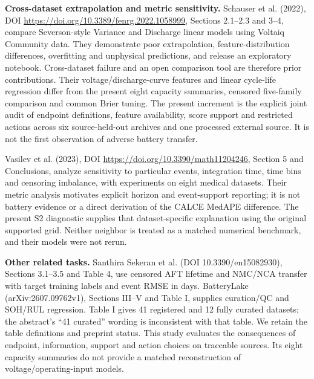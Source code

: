 \documentclass[10pt,a4paper]{article}
\begin{document}
\textbf{Cross-dataset extrapolation and metric sensitivity.} Schauser et al. (2022), DOI \url{https://doi.org/10.3389/fenrg.2022.1058999}, Sections 2.1--2.3 and 3--4, compare Severson-style Variance and Discharge linear models using Voltaiq Community data. They demonstrate poor extrapolation, feature-distribution differences, overfitting and unphysical predictions, and release an exploratory notebook. Cross-dataset failure and an open comparison tool are therefore prior contributions. Their voltage/discharge-curve features and linear cycle-life regression differ from the present eight capacity summaries, censored five-family comparison and common Brier tuning. The present increment is the explicit joint audit of endpoint definitions, feature availability, score support and restricted actions across six source-held-out archives and one processed external source. It is not the first observation of adverse battery transfer.

Vasilev et al. (2023), DOI \url{https://doi.org/10.3390/math11204246}, Section 5 and Conclusions, analyze sensitivity to particular events, integration time, time bins and censoring imbalance, with experiments on eight medical datasets. Their metric analysis motivates explicit horizon and event-support reporting; it is not battery evidence or a direct derivation of the CALCE MedAPE difference. The present S2 diagnostic supplies that dataset-specific explanation using the original supported grid. Neither neighbor is treated as a matched numerical benchmark, and their models were not rerun.

\textbf{Other related tasks.} Santhira Sekeran et al. (DOI 10.3390/en15082930), Sections 3.1--3.5 and Table 4, use censored AFT lifetime and NMC/NCA transfer with target training labels and event RMSE in days. BatteryLake (arXiv:2607.09762v1), Sections III--V and Table I, supplies curation/QC and SOH/RUL regression. Table I gives 41 registered and 12 fully curated datasets; the abstract's ``41 curated'' wording is inconsistent with that table. We retain the table definitions and preprint status. This study evaluates the consequences of endpoint, information, support and action choices on traceable sources. Its eight capacity summaries do not provide a matched reconstruction of voltage/operating-input models.
\end{document}
